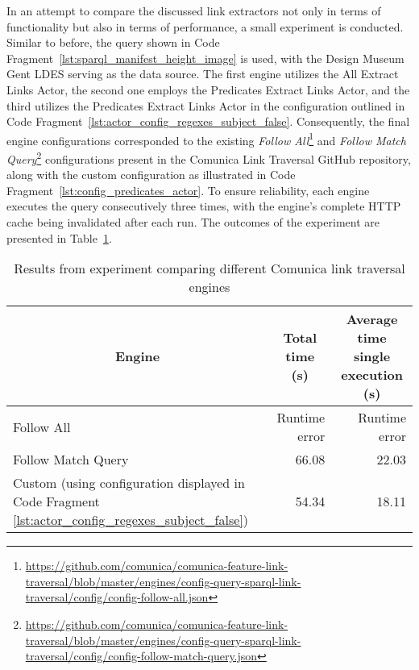 In an attempt to compare the discussed link extractors not only in terms of functionality but also in terms of performance, a small experiment is conducted. Similar to before, the query shown in Code Fragment~\ref{lst:sparql_manifest_height_image} is used, with the Design Museum Gent LDES serving as the data source. The first engine utilizes the All Extract Links Actor, the second one employs the Predicates Extract Links Actor, and the third utilizes the Predicates Extract Links Actor in the configuration outlined in Code Fragment~\ref{lst:actor_config_regexes_subject_false}. Consequently, the final engine configurations corresponded to the existing \textit{Follow All}\footnote{\href{https://github.com/comunica/comunica-feature-link-traversal/blob/master/engines/config-query-sparql-link-traversal/config/config-follow-all.json}{https://github.com/comunica/comunica-feature-link-traversal/blob/master/engines/config-query-sparql-link-traversal/config/config-follow-all.json}} and \textit{Follow Match Query}\footnote{\href{https://github.com/comunica/comunica-feature-link-traversal/blob/master/engines/config-query-sparql-link-traversal/config/config-follow-match-query.json}{https://github.com/comunica/comunica-feature-link-traversal/blob/master/engines/config-query-sparql-link-traversal/config/config-follow-match-query.json}} configurations present in the Comunica Link Traversal GitHub repository, along with the custom configuration as illustrated in Code Fragment~\ref{lst:config_predicates_actor}. To ensure reliability, each engine executes the query consecutively three times, with the engine's complete HTTP cache being invalidated after each run. The outcomes of the experiment are presented in Table~\ref{tab:results_engines}.

\begin{table}[htbp]
    \centering
    \captionsetup{justification=centering}
    \caption{Results from experiment comparing different Comunica link traversal engines}
    \label{tab:results_engines}
    \begin{tabular}{lrr}
        \toprule
        \multicolumn{1}{c}{Engine} & \multicolumn{1}{c}{Total time (s)} & \multicolumn{1}{c}{Average time single execution (s)} \\
        \midrule
        Follow All & Runtime error & Runtime error \\
        Follow Match Query & 66.08 & 22.03 \\
        Custom (using configuration displayed in Code Fragment \ref{lst:actor_config_regexes_subject_false}) & 54.34 & 18.11 \\
        \bottomrule
    \end{tabular}
\end{table}

